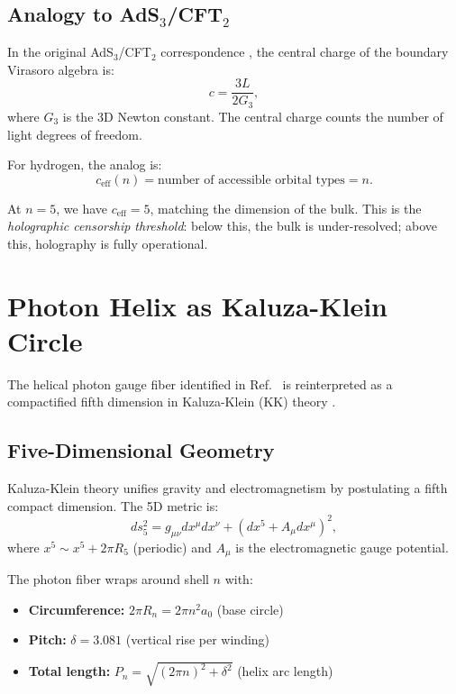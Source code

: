 \documentclass[aps,prd,twocolumn,superscriptaddress,floatfix]{revtex4-2}
\begin{document}
\subsection{Analogy to AdS$_3$/CFT$_2$}

In the original AdS$_3$/CFT$_2$ correspondence \cite{brown1986,strominger1998}, the central charge of the boundary Virasoro algebra is:
\begin{equation}
c = \frac{3L}{2G_3},
\end{equation}
where $G_3$ is the 3D Newton constant. The central charge counts the number of light degrees of freedom.

For hydrogen, the analog is:
\begin{equation}
c_{\text{eff}}(n) = \text{number of accessible orbital types} = n.
\end{equation}

At $n=5$, we have $c_{\text{eff}} = 5$, matching the dimension of the bulk. This is the \textit{holographic censorship threshold}: below this, the bulk is under-resolved; above this, holography is fully operational.


\section{Photon Helix as Kaluza-Klein Circle}

The helical photon gauge fiber identified in Ref.~\cite{companion_alpha} is reinterpreted as a compactified fifth dimension in Kaluza-Klein (KK) theory \cite{kaluza1921,klein1926}.

\subsection{Five-Dimensional Geometry}

Kaluza-Klein theory unifies gravity and electromagnetism by postulating a fifth compact dimension. The 5D metric is:
\begin{equation}
ds_5^2 = g_{\mu\nu} dx^\mu dx^\nu + (dx^5 + A_\mu dx^\mu)^2,
\label{eq:kk_metric}
\end{equation}
where $x^5 \sim x^5 + 2\pi R_5$ (periodic) and $A_\mu$ is the electromagnetic gauge potential.

The photon fiber wraps around shell $n$ with:
\begin{itemize}
\item \textbf{Circumference:} $2\pi R_n = 2\pi n^2 a_0$ (base circle)
\item \textbf{Pitch:} $\delta = 3.081$ (vertical rise per winding)
\item \textbf{Total length:} $P_n = \sqrt{(2\pi n)^2 + \delta^2}$ (helix arc length)
\end{itemize}
\end{document}
